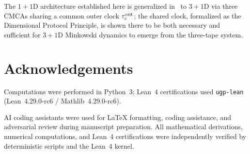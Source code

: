 \documentclass[11pt]{article}
\theoremstyle{remark}
\begin{document}
The $1+1$D architecture established here is generalized
in~\cite{SpivackThreeTapeCMCA} to $3+1$D via three CMCAs sharing a common
outer clock $\tau_c^{\rm out}$; the shared clock, formalized as the
Dimensional Protocol Principle, is shown there to be both necessary and
sufficient for $3+1$D Minkowski dynamics to emerge from the three-tape
system.

\section*{Acknowledgements}
Computations were performed in Python~3; Lean~4 certifications used
\texttt{ugp-lean} (Lean~4.29.0-rc6 / Mathlib~4.29.0-rc6).

AI coding assistants were used for \LaTeX{} formatting, coding assistance, and adversarial review during manuscript preparation. All mathematical derivations, numerical computations, and Lean~4 certifications were independently verified by deterministic scripts and the Lean~4 kernel.



\end{document}

